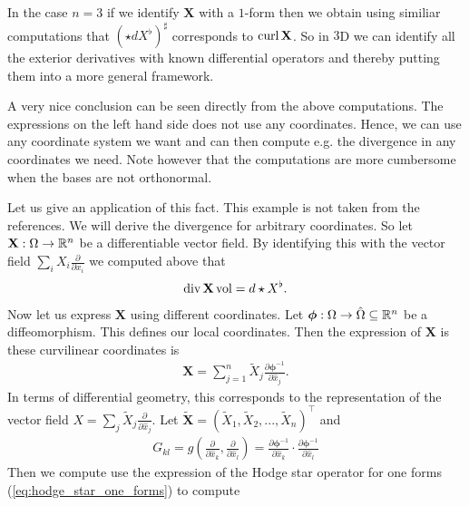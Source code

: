 \documentclass[../master_thesis.tex]{subfiles}
\begin{document}
In the case $n=3$ if we identify $\mathbf{X}$ with a $1$-form then 
we obtain using similiar computations
that $(\star d X^\flat)^\sharp$ corresponds to  $\mathbf{\operatorname{curl}} \,\mathbf{X}$.
So in $3$D we can identify all the exterior derivatives with known differential
operators and thereby putting them into a more general framework.

A very nice conclusion can be seen directly from the above computations. The 
expressions on the left hand side does not use any coordinates. Hence, 
we can use any coordinate system we want and can then compute e.g. the 
divergence in any coordinates we need. Note however that the computations are
more cumbersome when the bases are not orthonormal.

Let us give an application of this fact. This example is not taken from the 
references. We will derive the divergence for arbitrary coordinates. 
So let $\mathbf{X}: \Omega \rightarrow \mathbb{R}^n$ be a differentiable vector field. By 
identifying this with the vector field $\sum_i X_i \frac{\partial}{\partial x_i}
$ we computed above that 
\begin{align*}
    \operatorname{div} \mathbf{X} \operatorname{vol} = d \star X^\flat.
\end{align*}
Now let us express $\mathbf{X}$ using different coordinates. 
Let $\bm{\phi}: \Omega \rightarrow \hat{\Omega} \subseteq \mathbb{R}^n$ be a diffeomorphism. 
This defines our local coordinates. Then the expression of $\mathbf{X}$ is
these curvilinear coordinates is
\begin{align*}
    \mathbf{X} = \sum_{j=1}^n \tilde{X}_j 
        \frac{\partial \bm{\phi}^{-1}}{\partial \hat{x}_j}.
\end{align*}
In terms of differential geometry, this corresponds to the representation of the vector field 
$X = \sum_j \tilde{X}_j \frac{\partial}{\partial \hat{x}_j}$. 
Let $\tilde{\mathbf{X}} = (\tilde{X}_1, \tilde{X}_2, ..., \tilde{X}_n)^\top$ 
and 
\begin{align*}
    G_{kl} = g(\frac{\partial}{\partial \hat{x}_k}, \frac{\partial}{\partial \hat{x}_l})
        = \frac{\partial \bm{\phi}^{-1}}{\partial \hat{x}_k} \cdot 
            \frac{\partial \bm{\phi}^{-1}}{\partial \hat{x}_l}
\end{align*}
Then we compute use the expression of the Hodge star operator 
for one forms (\ref{eq:hodge_star_one_forms}) to compute
\end{document}
